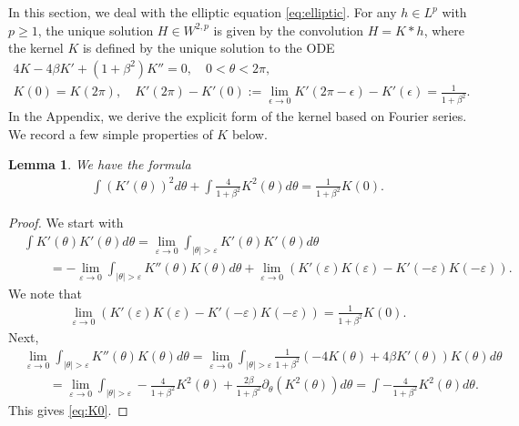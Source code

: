 \documentclass[10pt]{article}
\newtheorem{lemma}[theorem]{Lemma}
\theoremstyle{definition}
\theoremstyle{remark}
\numberwithin{equation}{section}
\newcommand{\rd}{\partial}
\newcommand{\0}{\emptyset}
\newcommand{\bt}{\beta}
\newcommand{\tht}{\theta}
\begin{document}
	In this section, we deal with the elliptic equation \eqref{eq:elliptic}. For any $h \in L^p$ with $p\ge1$, the unique solution $H \in W^{2,p}$ is given by the convolution $H=K*h$, where the kernel $K$ is defined by the unique solution to the ODE 
	\begin{equation}\label{eq:K}
 \begin{split}
			4K - 4\bt K' + (1+\bt^2)K'' = 0, \quad 0<\tht<2\pi, \\
			K(0) = K(2\pi), \quad K'(2\pi)-K'(0) := \lim_{\epsilon\to 0}K'(2\pi-\epsilon)-K'(\epsilon)=\frac{1}{1+\beta^2}. 
    \end{split}
	\end{equation} In the Appendix, we derive the explicit form of the kernel based on Fourier series. We record a few simple properties of $K$ below. 
	\begin{lemma} We have the formula
		\begin{equation}\label{eq:K0}
			\begin{split}
				\int  (K'(\tht ))^2 d\tht + \int \frac{4}{1+\bt^2} K^2(\tht ) d\tht  = \frac{1}{1+\bt^2}K(0).  
			\end{split}
		\end{equation} 
	\end{lemma}
	\begin{proof} We start with 
		\begin{equation*}
			\begin{split}
				&\int K'(\tht )K'(\tht ) d\tht = \lim_{\varepsilon\to0} \int_{ |\tht |>\varepsilon}   K'(\tht )K'(\tht ) d\tht  \\
				&\qquad =  - \lim_{\varepsilon\to0} \int_{ |\tht |>\varepsilon}  K''(\tht )K(\tht ) d\tht + \lim_{\varepsilon\to0} (K'(\varepsilon)K(\varepsilon) - K'(-\varepsilon)K(-\varepsilon)). 
			\end{split}
		\end{equation*} We note that \begin{equation*}
			\begin{split}
				\lim_{\varepsilon\to0} (K'(\varepsilon)K(\varepsilon) - K'(-\varepsilon)K(-\varepsilon)) = \frac{1}{1+\bt^2}K(0).  
			\end{split}
		\end{equation*} Next, \begin{equation*}
			\begin{split}
				&\lim_{\varepsilon\to0} \int_{ |\tht |>\varepsilon}  K''(\tht )K(\tht ) d\tht  = \lim_{\varepsilon\to0} \int_{ |\tht |>\varepsilon} \frac{1}{1+\bt^2} \left( -4K(\tht ) + 4\bt K'(\tht ) \right)K(\tht ) d\tht \\
				&\qquad = \lim_{\varepsilon\to0} \int_{ |\tht |>\varepsilon} -\frac{4}{1+\bt^2} K^2(\tht ) + \frac{2\bt}{1+\bt^2} \rd_\tht ( K^2(\tht ) ) d\tht = \int -\frac{4}{1+\bt^2} K^2(\tht ) d\tht . 
			\end{split}
		\end{equation*} This gives \eqref{eq:K0}. 
	\end{proof}
	
\end{document}
